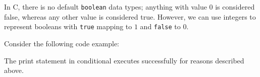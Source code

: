 In C, there is no default \verb!boolean! data types; anything with value $0$ is considered false, whereas any other value is considered true. However, we can use integers to represent booleans with \verb!true! mapping to $1$ and \verb!false! to $0$.

Consider the following code example:



\lstset{
caption=Conditional Example
}
\begin{center}

\end{center}

The print statement in conditional executes successfully for reasons described above.


\newpage












